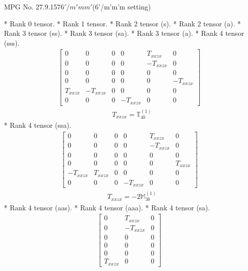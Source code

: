\documentclass[fleqn,8pt,landscape]{jsarticle}
\begin{document}
\setcounter{MaxMatrixCols}{32}

\renewcommand{\tablename}{Table~}
\renewcommand{\figurename}{Figure~}
\begin{center}
\LARGE
MPG No. 27.9.157\quad$6'/m'mm'$\quad(6'/m'm'm setting)
\end{center}
* Rank 0 tensor.
* Rank 1 tensor.
* Rank 2 tensor (s).
* Rank 2 tensor (a).
* Rank 3 tensor (ss).
* Rank 3 tensor (sa).
* Rank 3 tensor (a).
* Rank 4 tensor (sss).
\begin{align*}
\begin{bmatrix} 0 & 0 & 0 & 0 & T_{xxzx} & 0 \\ 0 & 0 & 0 & 0 & - T_{xxzx} & 0 \\ 0 & 0 & 0 & 0 & 0 & 0 \\ 0 & 0 & 0 & 0 & 0 & - T_{xxzx} \\ T_{xxzx} & - T_{xxzx} & 0 & 0 & 0 & 0 \\ 0 & 0 & 0 & - T_{xxzx} & 0 & 0 \end{bmatrix}
\end{align*}
\begin{align*}
& T_{xxzx} = \mathbb{T}_{4b}^{(1)}
\end{align*}
* Rank 4 tensor (ssa).
\begin{align*}
\begin{bmatrix} 0 & 0 & 0 & 0 & T_{xxzx} & 0 \\ 0 & 0 & 0 & 0 & - T_{xxzx} & 0 \\ 0 & 0 & 0 & 0 & 0 & 0 \\ 0 & 0 & 0 & 0 & 0 & T_{xxzx} \\ - T_{xxzx} & T_{xxzx} & 0 & 0 & 0 & 0 \\ 0 & 0 & 0 & - T_{xxzx} & 0 & 0 \end{bmatrix}
\end{align*}
\begin{align*}
& T_{xxzx} = - 2 \mathbb{M}_{3b}^{(1)}
\end{align*}
* Rank 4 tensor (aas).
* Rank 4 tensor (aaa).
* Rank 4 tensor (sa).
\begin{align*}
\begin{bmatrix} 0 & T_{xxzx} & 0 \\ 0 & - T_{xxzx} & 0 \\ 0 & 0 & 0 \\ 0 & 0 & 0 \\ 0 & 0 & 0 \\ T_{xxzx} & 0 & 0 \end{bmatrix}
\end{align*}
\end{document}
